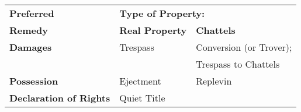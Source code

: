 
\begin{center}
\begin{tabular}{|l||l|l|}
\hline
\textbf{Preferred} & \multicolumn{2}{l|}{\textbf{Type of Property:}} \\
\cline{2-3}
\textbf{Remedy} & \strut \textbf{Real Property} & \textbf{Chattels} \\
\hline
\hline
\textbf{Damages} & Trespass & Conversion (or Trover); \\
 & & Trespass to Chattels \\
\hline
\textbf{Possession} & Ejectment & Replevin \\
\hline
\textbf{Declaration of Rights} & \multicolumn{2}{l|}{Quiet Title} \\
\hline
\end{tabular}
\end{center}

